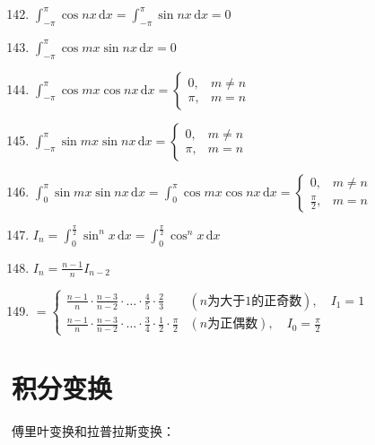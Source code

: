 \begin{enumerate}
    \setcounter{enumi}{141}
    \item $\displaystyle \int_{-\pi}^{\pi} \cos nx \, \mathrm{d}x = \int_{-\pi}^{\pi} \sin nx \, \mathrm{d}x = 0$
    \item $\displaystyle \int_{-\pi}^{\pi} \cos mx \sin nx \, \mathrm{d}x = 0$
    \item $\displaystyle \int_{-\pi}^{\pi} \cos mx \cos nx \, \mathrm{d}x = 
    \begin{cases}
        0, & m \neq n \\
        \pi, & m = n
    \end{cases}$
    \item $\displaystyle \int_{-\pi}^{\pi} \sin mx \sin nx \, \mathrm{d}x = 
    \begin{cases}
        0, & m \neq n \\
        \pi, & m = n
    \end{cases}$
    \item $\displaystyle \int_0^\pi \sin mx \sin nx \, \mathrm{d}x = \int_0^\pi \cos mx \cos nx \, \mathrm{d}x = 
    \begin{cases}
        0, & m \neq n \\
        \frac{\pi}{2}, & m = n
    \end{cases}$
    \item $\displaystyle I_n = \int_0^{\frac{\pi}{2}} \sin^n x \, \mathrm{d}x = \int_0^{\frac{\pi}{2}} \cos^n x \, \mathrm{d}x$
    \item[] $\displaystyle I_n = \frac{n - 1}{n} I_{n-2}$
    \item[] $\displaystyle = 
    \begin{cases}
        \displaystyle \frac{n - 1}{n} \cdot \frac{n - 3}{n - 2} \cdot \dots \cdot \frac{4}{5} \cdot \frac{2}{3} & (n \text{为大于} 1 \text{的正奇数}), \quad I_1 = 1 \\
        \displaystyle \frac{n - 1}{n} \cdot \frac{n - 3}{n - 2} \cdot \dots \cdot \frac{3}{4} \cdot \frac{1}{2} \cdot \frac{\pi}{2} & (n \text{为正偶数}), \quad I_0 = \frac{\pi}{2}
    \end{cases}$
\end{enumerate}

\section{积分变换}
傅里叶变换和拉普拉斯变换：
